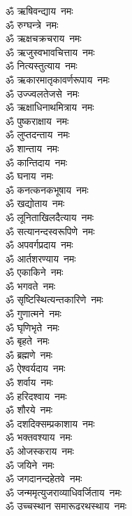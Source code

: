 \begin{multicols}{2}
\begin{flushleft}
        ॐ ऋषिवन्द्याय~नमः\\
        ॐ रुग्घन्त्रे~नमः\\
        ॐ ऋक्षचक्रचराय~नमः\\
        ॐ ऋजुस्वभावचित्ताय~नमः\hfill{}\\
        ॐ नित्यस्तुत्याय~नमः\\
        ॐ ऋकारमातृकावर्णरूपाय~नमः\\
        ॐ उज्ज्वलतेजसे~नमः\\
        ॐ ऋक्षाधिनाथमित्राय~नमः\\
        ॐ पुष्कराक्षाय~नमः\\
        ॐ लुप्तदन्ताय~नमः\\
        ॐ शान्ताय~नमः\\
        ॐ कान्तिदाय~नमः\\
        ॐ घनाय~नमः\\
        ॐ कनत्कनकभूषाय~नमः\hfill{}\\
        ॐ खद्योताय~नमः\\
        ॐ लूनिताखिलदैत्याय~नमः\\
        ॐ सत्यानन्दस्वरूपिणे~नमः\\
        ॐ अपवर्गप्रदाय~नमः\\
        ॐ आर्तशरण्याय~नमः\\
        ॐ एकाकिने~नमः\\
        ॐ भगवते~नमः\\
        ॐ सृष्टिस्थित्यन्तकारिणे~नमः\\
        ॐ गुणात्मने~नमः\\
        ॐ घृणिभृते~नमः\hfill{}\\
        ॐ बृहते~नमः\\
        ॐ ब्रह्मणे~नमः\\
        ॐ ऐश्वर्यदाय~नमः\\
        ॐ शर्वाय~नमः\\
        ॐ हरिदश्वाय~नमः\\
        ॐ शौरये~नमः\\
        ॐ दशदिक्सम्प्रकाशाय~नमः\\
        ॐ भक्तवश्याय~नमः\\
        ॐ ओजस्कराय~नमः\\
        ॐ जयिने~नमः\hfill{}\\
        ॐ जगदानन्दहेतवे~नमः\\
        ॐ जन्ममृत्युजराव्याधिवर्जिताय~नमः\\
        ॐ उच्चस्थान समारूढरथस्थाय~नमः\\

\end{flushleft}
\end{multicols}
